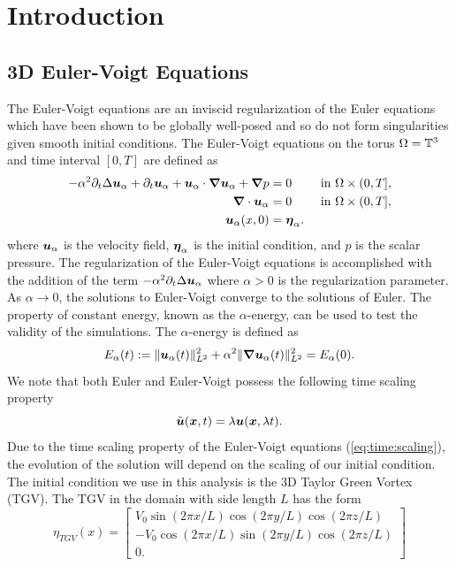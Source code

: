 \chapter{Introduction}

\section{3D Euler-Voigt Equations}
The Euler-Voigt equations are an inviscid regularization of the Euler equations which have been shown to be globally well-posed and so do not form singularities given smooth initial conditions. The Euler-Voigt equations on the torus $\Omega = \mathbb{T}^3$ and time interval $[0,T]$ are defined as
\begin{subequations}\label{eq:Euler:Voigt}
\begin{align}
-\alpha^2\partial_t\Delta\boldsymbol u_\alpha + \partial_t \boldsymbol u_\alpha + \boldsymbol u_\alpha\cdot \boldsymbol \nabla\boldsymbol u_\alpha + \boldsymbol \nabla p &= 0 \qquad\text{ in } \Omega\times (0,T],\\ 
\boldsymbol \nabla \cdot \boldsymbol u_\alpha &= 0 \qquad\text{ in } \Omega\times (0,T],\\
\boldsymbol u_\alpha(x,0) &= \boldsymbol \eta_\alpha.
\end{align}
\end{subequations}
where $\boldsymbol u_\alpha$ is the velocity field, $\boldsymbol \eta_\alpha$ is the initial condition, and $p$ is the scalar pressure. The regularization of the Euler-Voigt equations is accomplished with the addition of the term $-\alpha^2\partial_t \Delta \boldsymbol u_\alpha$ where $\alpha >0$ is the regularization parameter. As $\alpha\rightarrow 0$, the solutions to Euler-Voigt converge to the solutions of Euler. The property of constant energy, known as the $\alpha$-energy, can be used to test the validity of the simulations. The $\alpha$-energy is defined as
\begin{equation}\label{eq:alpha:Energy}
E_\alpha(t):=\|\boldsymbol u_\alpha(t)\|_{L^2}^2 + \alpha^2\|\boldsymbol \nabla\boldsymbol u_\alpha(t)\|_{L^2}^2 = E_\alpha(0).
\end{equation}
We note that both Euler and Euler-Voigt possess the following time scaling property
\begin{equation}\label{eq:time:scaling}
\tilde{\boldsymbol u}(\boldsymbol x,t) = \lambda\boldsymbol u(\boldsymbol x,\lambda t).
\end{equation}
Due to the time scaling property of the Euler-Voigt equations (\ref{eq:time:scaling}), the evolution of the solution will depend on the scaling of our initial condition. The initial condition we use in this analysis is the 3D Taylor Green Vortex (TGV). The TGV in the domain with side length $L$ has the form
\begin{equation}\label{eq:TGV}
\eta_{TGV}(x) = \begin{bmatrix}
V_0\sin(2\pi x/L)\cos(2\pi y/L)\cos(2\pi z/L) \\
-V_0\cos(2\pi x/L)\sin(2\pi y/L)\cos(2\pi z/L) \\
0.
\end{bmatrix}
\end{equation}
